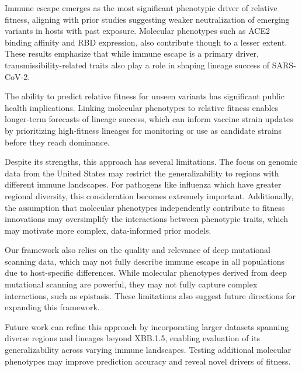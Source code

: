 Immune escape emerges as the most significant phenotypic driver of relative fitness, aligning with prior studies suggesting weaker neutralization of emerging variants in hosts with past exposure.
Molecular phenotypes such as ACE2 binding affinity and RBD expression, also contribute though to a lesser extent.
These results emphasize that while immune escape is a primary driver, transmissibility-related traits also play a role in shaping lineage success of SARS-CoV-2.

The ability to predict relative fitness for unseen variants has significant public health implications.
Linking molecular phenotypes to relative fitness enables longer-term forecasts of lineage success, which can inform vaccine strain updates by prioritizing high-fitness lineages for monitoring or use as candidate strains before they reach dominance.


Despite its strengths, this approach has several limitations.
The focus on genomic data from the United States may restrict the generalizability to regions with different immune landscapes.
For pathogens like influenza which have greater regional diversity, this consideration becomes extremely important.
Additionally, the assumption that molecular phenotypes independently contribute to fitness innovations may oversimplify the interactions between phenotypic traits, which may motivate more complex, data-informed prior models.

Our framework also relies on the quality and relevance of deep mutational scanning data, which may not fully describe immune escape in all populations due to host-specific differences.
While molecular phenotypes derived from deep mutational scanning are powerful, they may not fully capture complex interactions, such as epistasis.
These limitations also suggest future directions for expanding this framework.

Future work can refine this approach by incorporating larger datasets spanning diverse regions and lineages beyond XBB.1.5, enabling evaluation of its generalizability across varying immune landscapes. Testing additional molecular phenotypes may improve prediction accuracy and reveal novel drivers of fitness.

